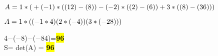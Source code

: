 \vspace{2mm} %

$
A =
1*( \\
  +(-1)*( (12)-(8) )  \\
  -(-2)*( (2)-(6) ) \\
  +3*( (8)-(36) )  \\
) \\
$

\vspace{2mm} %

$
A =
1*((-1*4)  \\
  (2*(-4)) \\
  (3*(-28))  \\
) \\
$

\vspace{2mm} %
4−(−8)−(−84)=\hl{\textbf{96}} \\
S= det(A) = \hl{\textbf{96}} \\
